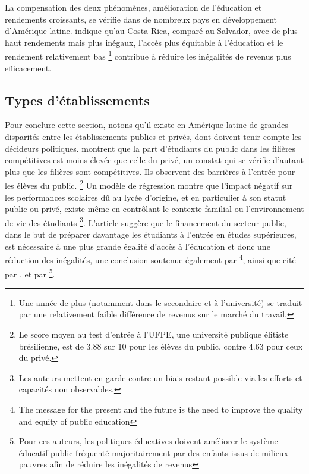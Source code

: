 \documentclass[pagesize, twoside=off, bibliography=totoc, DIV=calc, fontsize=12pt, a4paper, french]{scrartcl}
\begin{document}
La compensation des deux phénomènes, amélioration de l’éducation et rendements croissants, se vérifie dans de nombreux pays en développement d’Amérique latine.  indique qu’au Costa Rica, comparé au Salvador, avec de plus haut rendements mais plus inégaux, l’accès plus équitable à l’éducation et le rendement relativement bas \footnote{Une année de plus (notamment dans le secondaire et à l’université) se traduit par une relativement faible différence de revenus sur le marché du travail.} contribue à réduire les inégalités de revenus plus efficacement. 

\subsection{Types d’établissements}

Pour conclure cette section, notons qu’il existe en Amérique latine de grandes disparités entre les établissements publics et privés, dont doivent tenir compte les décideurs politiques.  montrent que la part d’étudiants du public dans les filières compétitives est moins élevée que celle du privé, un constat qui se vérifie d’autant plus que les filières sont compétitives. Ils observent des barrières à l’entrée pour les élèves du public. \footnote{Le score moyen au test d’entrée à l’UFPE, une université publique élitiste brésilienne, est de 3.88 sur 10 pour les élèves du public, contre 4.63 pour ceux du privé.} Un modèle de régression montre que l’impact négatif sur les performances scolaires dû au lycée d’origine, et en particulier à son statut public ou privé, existe même en contrôlant le contexte familial ou l’environnement de vie des étudiants \footnote{Les auteurs mettent en garde contre un biais restant possible via les efforts et capacités non observables.}. L’article suggère que le financement du secteur public, dans le but de préparer davantage les étudiants à l’entrée en études supérieures, est nécessaire à une plus grande égalité d’accès à l’éducation et donc une réduction des inégalités, une conclusion soutenue également par \citet{bravo_competencias_2011} \footnote{\og{}The message for the present and the future is the need to improve the quality and equity of public education\fg{}}, ainsi que cité par \citet{carlson_education_2002}, et par \citet{ferreira_rise_2008} \footnote{Pour ces auteurs, les politiques éducatives doivent améliorer le système éducatif public fréquenté majoritairement par des enfants issus de milieux pauvres afin de réduire les inégalités de revenus}.
\end{document}
